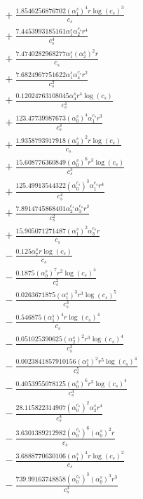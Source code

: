 \documentclass[10pt]{article}
\begin{document}
\begin{align*}
&{}  + \frac{1.8546256876702 \left(\alpha_{1}^s\right)^{4} r \log{\left(c_{s} \right)}^{3}}{c_{s}} \\
&{}  + \frac{7.4453993185161 \alpha_{1}^s \alpha_{2}^{c_s} r^{4}}{c_{s}^{4}} \\
&{}  + \frac{7.4740282968277 \alpha_{1}^s \left(\alpha_{2}^s\right)^{2} r}{c_{s}} \\
&{}  + \frac{7.6824967751622 \alpha_{1}^s \alpha_{4}^{c_s} r^{2}}{c_{s}^{2}} \\
&{}  + \frac{0.12024763108045 \alpha_{4}^s r^{4} \log{\left(c_{s} \right)}}{c_{s}^{4}} \\
&{}  + \frac{123.47739987673 \left(\alpha_{0}^s\right)^{4} \alpha_{1}^{c_s} r^{3}}{c_{s}^{3}} \\
&{}  + \frac{1.9358793917918 \left(\alpha_{3}^s\right)^{2} r \log{\left(c_{s} \right)}}{c_{s}} \\
&{}  + \frac{15.608776360849 \left(\alpha_{0}^s\right)^{6} r^{3} \log{\left(c_{s} \right)}}{c_{s}^{3}} \\
&{}  + \frac{125.49913544322 \left(\alpha_{0}^{c_s}\right)^{3} \alpha_{1}^{c_s} r^{4}}{c_{s}^{4}} \\
&{}  + \frac{7.8914745868401 \alpha_{2}^{c_s} \alpha_{3}^{c_s} r^{2}}{c_{s}^{2}} \\
&{}  + \frac{15.905071271487 \left(\alpha_{1}^s\right)^{2} \alpha_{3}^{c_s} r}{c_{s}} \\
&{}  - \frac{0.125 \alpha_{7}^s r \log{\left(c_{s} \right)}}{c_{s}} \\
&{}  - \frac{0.1875 \left(\alpha_{0}^s\right)^{7} r^{2} \log{\left(c_{s} \right)}^{4}}{c_{s}^{2}} \\
&{}  - \frac{0.0263671875 \left(\alpha_{1}^s\right)^{3} r^{3} \log{\left(c_{s} \right)}^{5}}{c_{s}^{3}} \\
&{}  - \frac{0.546875 \left(\alpha_{1}^s\right)^{4} r \log{\left(c_{s} \right)}^{4}}{c_{s}} \\
&{}  - \frac{0.051025390625 \left(\alpha_{2}^s\right)^{2} r^{3} \log{\left(c_{s} \right)}^{4}}{c_{s}^{3}} \\
&{}  - \frac{0.0023841857910156 \left(\alpha_{1}^s\right)^{2} r^{5} \log{\left(c_{s} \right)}^{4}}{c_{s}^{5}} \\
&{}  - \frac{0.4053955078125 \left(\alpha_{0}^s\right)^{6} r^{3} \log{\left(c_{s} \right)}^{4}}{c_{s}^{3}} \\
&{}  - \frac{28.115822314907 \left(\alpha_{0}^{c_s}\right)^{2} \alpha_{2}^s r^{4}}{c_{s}^{4}} \\
&{}  - \frac{3.6301389212982 \left(\alpha_{0}^{c_s}\right)^{6} \left(\alpha_{0}^s\right)^{2} r}{c_{s}} \\
&{}  - \frac{3.6888770630106 \left(\alpha_{1}^s\right)^{4} r \log{\left(c_{s} \right)}^{2}}{c_{s}} \\
&{}  - \frac{739.99163748858 \left(\alpha_{0}^{c_s}\right)^{3} \left(\alpha_{0}^s\right)^{3} r^{3}}{c_{s}^{3}}
\end{align*}
\end{document}
